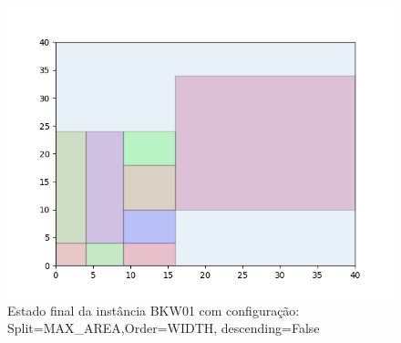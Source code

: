 \begin{figure}[H]
    \centering
    \caption[]{Estado final da instância BKW01 com configuração: Split=MAX_AREA,Order=WIDTH, descending=False}
    \label{fig:bkw01-max_area-width-false}
    \includegraphics[scale=0.5]{output/figures/bkw/bkw01/max_area/width/false/00}
\end{figure}